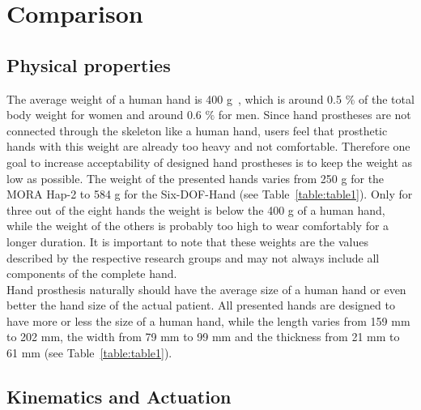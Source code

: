 \documentclass[a4paper, 10pt, conference]{ieeeconf}      %
\begin{document}
\newpage%

\section{Comparison}

\subsection{Physical properties}

The average weight of a human hand is 400 g~\cite{humanbody}, which is around 0.5 $\%$ of the total body weight for women and around 0.6 $\%$ for men. Since hand prostheses are not connected through the skeleton like a human hand, users feel that prosthetic hands with this weight are already too heavy and not comfortable. Therefore one goal to increase acceptability of designed hand prostheses is to keep the weight as low as possible. The weight of the presented hands varies from 250 g for the MORA Hap-2 to 584 g for the Six-DOF-Hand (see Table~\ref{table:table1}). Only for three out of the eight hands the weight is below the 400 g of a human hand, while the weight of the others is probably too high to wear comfortably for a longer duration. It is important to note that these weights are the values described by the respective research groups and may not always include all components of the complete hand.\\
Hand prosthesis naturally should have the average size of a human hand or even better the hand size of the actual patient. All presented hands are designed to have more or less the size of a human hand, while the length varies from 159 mm to 202 mm, the width from 79 mm to 99 mm and the thickness from 21 mm to 61 mm (see Table~\ref{table:table1}).

\subsection{Kinematics and Actuation}
\end{document}
